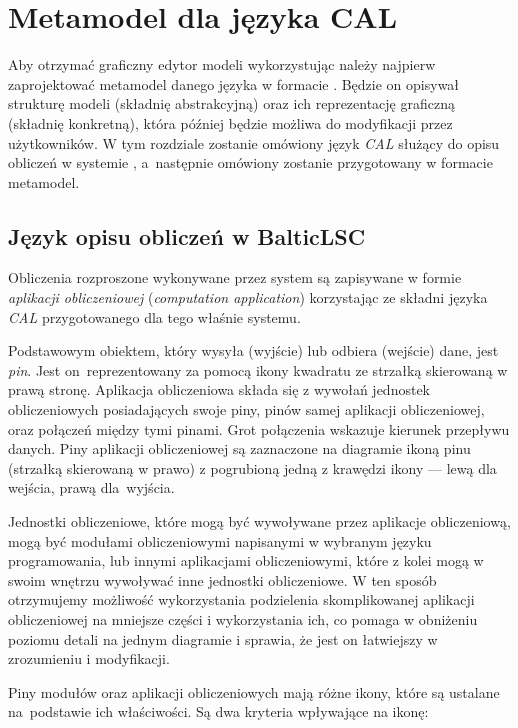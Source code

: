 \chapter{Metamodel dla języka CAL}\label{chapter:cal-metamodel}

Aby otrzymać graficzny edytor modeli wykorzystując \SiriusWeb{} należy
najpierw zaprojektować metamodel danego języka w formacie \Ecore{}. Będzie on
opisywał strukturę modeli (składnię abstrakcyjną) oraz ich
reprezentację graficzną (składnię konkretną), która później będzie możliwa do
modyfikacji przez użytkowników. W tym rozdziale
zostanie omówiony język \emph{\acrfull{CAL}} służący do opisu obliczeń w
systemie \BalticLSC{}, a~następnie omówiony zostanie przygotowany w formacie
\Ecore{} metamodel.

\section{Język opisu obliczeń w BalticLSC}

Obliczenia rozproszone wykonywane przez system \BalticLSC{} są zapisywane w
formie \emph{aplikacji obliczeniowej}
(\emph{computation application})
korzystając ze składni języka \emph{\acrfull{CAL}} przygotowanego dla tego
właśnie systemu.

Podstawowym obiektem, który wysyła (wyjście)
lub odbiera (wejście) dane, jest \emph{pin}. Jest on~reprezentowany za pomocą
ikony kwadratu ze strzałką skierowaną w prawą stronę. Aplikacja obliczeniowa
składa się z wywołań jednostek obliczeniowych posiadających swoje piny, pinów
samej aplikacji obliczeniowej, oraz połączeń między tymi pinami. Grot
połączenia wskazuje kierunek przepływu danych.
Piny aplikacji obliczeniowej są zaznaczone na
diagramie ikoną pinu (strzałką skierowaną w prawo) z pogrubioną
jedną z krawędzi ikony --- lewą dla wejścia, prawą dla~wyjścia.

Jednostki obliczeniowe, które mogą być wywoływane przez aplikacje obliczeniową,
mogą być modułami obliczeniowymi napisanymi w wybranym języku programowania,
lub innymi aplikacjami obliczeniowymi, które z kolei mogą w swoim wnętrzu
wywoływać inne jednostki obliczeniowe. W ten sposób otrzymujemy możliwość
wykorzystania podzielenia skomplikowanej aplikacji obliczeniowej na mniejsze
części i wykorzystania ich, co pomaga w obniżeniu poziomu detali na jednym
diagramie i sprawia, że jest on łatwiejszy w zrozumieniu i modyfikacji.

Piny modułów oraz aplikacji obliczeniowych mają różne ikony, które
są ustalane na~podstawie ich właściwości. Są dwa kryteria wpływające na ikonę:

